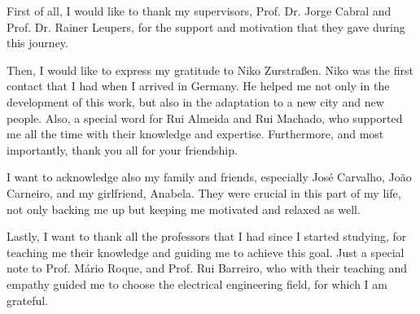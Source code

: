 
First of all, I would like to thank my supervisors, Prof. Dr. Jorge Cabral and Prof. Dr. Rainer Leupers, for the support and motivation that 
they gave during this journey.

Then, I would like to express my gratitude to Niko Zurstraßen. Niko was the first contact that I had when I arrived in Germany. He helped me 
not only in the development of this work, but also in the adaptation to a new city and new people. Also, a special word for Rui Almeida and 
Rui Machado, who supported me all the time with their knowledge and expertise. Furthermore, and most importantly, thank you all for your 
friendship.

I want to acknowledge also my family and friends, especially José Carvalho, João Carneiro, and my girlfriend, Anabela. 
They were crucial in this part of my life, not only backing me up but keeping me motivated and relaxed as well.

Lastly, I want to thank all the professors that I had since I started studying, for teaching me their knowledge and guiding me to achieve this 
goal. Just a special note to Prof. Mário Roque, and Prof. Rui Barreiro, who with their teaching and empathy guided me to 
choose the electrical engineering field, for which I am grateful.
